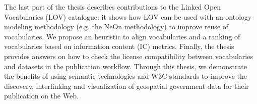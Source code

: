 The last part of the thesis describes contributions to the Linked Open Vocabularies (LOV) catalogue: it shows how LOV can be used with an ontology modeling methodology (e.g. the NeOn methodology) to improve reuse of vocabularies. We propose an heuristic to align vocabularies and a ranking of vocabularies based on information content (IC) metrics. Finally, the thesis provides answers on how to check the license compatibility between vocabularies and datasets in the publication workflow. Through this thesis, we demonstrate the benefits of using semantic technologies and W3C standards to improve the discovery, interlinking and visualization of geospatial government data for their publication on the Web. 
